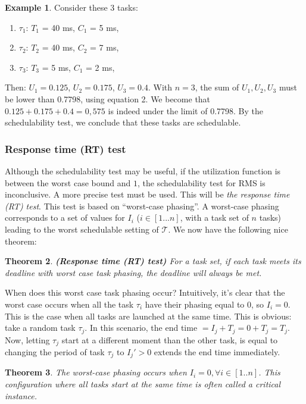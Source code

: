 \documentclass[a4paper,12pt]{article}
\newtheorem{theorem}{Theorem}[section]
\theoremstyle{definition}
\newtheorem{example}[theorem]{Example}
\newcommand{\Tau}{\mathcal{T}}
\begin{document}
\begin{example}
  Consider these 3 tasks:
  \begin{enumerate}
    \item $\tau_1$: $T_1$ = 40 ms,  $C_1$ = 5 ms,
    \item $\tau_2$: $T_2$ = 40 ms,  $C_2$ = 7 ms,
    \item  $\tau_3$: $T_3$ = 5 ms,   $C_1$ = 2 ms,
  \end{enumerate}
  Then: $U_1 = 0.125$, $U_2 = 0.175$, $U_3 = 0.4$. With $n=3$, the sum of $U_1, U_2, U_3$ must be lower than 0.7798, using equation 2.  We become that $0.125 + 0.175 + 0.4 = 0, 575$ 
  is indeed under the limit of 0.7798. By the schedulability test, we conclude 
  that these tasks are schedulable. 
\end{example}
\subsubsection{Response time (RT) test}
Although the schedulability test may be useful, if the utilization function is 
between the worst case bound and $1$, the schedulability test for RMS is 
inconclusive. A more precise test must be used. This will be \emph{the response time (RT) 
test}. This test is based on ``worst-case phasing''. A worst-case phasing 
corresponds to a set of values for $I_i$ ($ i \in [1...n]$, with a task set of $n$ 
tasks) leading to the worst schedulable setting of $\Tau$. We now have the 
following nice theorem:
\begin{theorem}\textbf{(Response time (RT) test)}
  For a task set, 
  if each task meets its deadline with worst case task phasing, the deadline will always be 
  met.
\end{theorem}
  When does this worst case task phasing occur? Intuitively, it's clear that the 
  worst case occurs when all the task $\tau_i$ have their phasing equal to 0, so 
  $I_i=0$. This is the case when all tasks are launched at the same time. This 
  is obvious: take a random task $\tau_j$. In this scenario, the end time $= I_j + T_j = 0 + T_j = T_j$.
  Now, letting $\tau_j$ start at a different moment than the other task, is equal to changing the period of task $\tau_j$ to 
  $I_j' > 0$ extends the end time immediately.
  
  \begin{theorem}
    The worst-case phasing occurs when $I_i = 0, \forall i \in [1 .. n]$. This 
    configuration where all tasks start at the same time is often called a
    \emph{critical instance}.
  \end{theorem}
  
\end{document}

